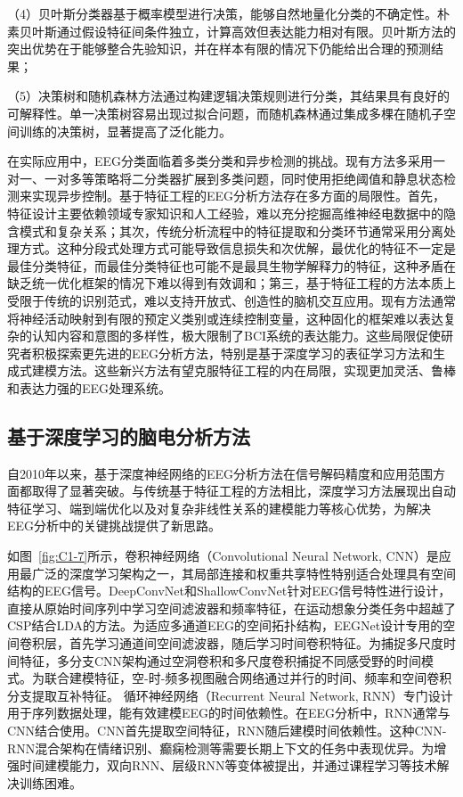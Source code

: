（4）贝叶斯分类器基于概率模型进行决策，能够自然地量化分类的不确定性\cite{friedman1997bayesian}。朴素贝叶斯通过假设特征间条件独立，计算高效但表达能力相对有限。贝叶斯方法的突出优势在于能够整合先验知识，并在样本有限的情况下仍能给出合理的预测结果；

（5）决策树和随机森林方法通过构建逻辑决策规则进行分类，其结果具有良好的可解释性\cite{fraiwan2012automated}。单一决策树容易出现过拟合问题，而随机森林通过集成多棵在随机子空间训练的决策树，显著提高了泛化能力。


在实际应用中，EEG分类面临着多类分类和异步检测的挑战。现有方法多采用一对一、一对多等策略将二分类器扩展到多类问题，同时使用拒绝阈值和静息状态检测来实现异步控制。基于特征工程的EEG分析方法存在多方面的局限性。首先，特征设计主要依赖领域专家知识和人工经验，难以充分挖掘高维神经电数据中的隐含模式和复杂关系；其次，传统分析流程中的特征提取和分类环节通常采用分离处理方式。这种分段式处理方式可能导致信息损失和次优解，最优化的特征不一定是最佳分类特征，而最佳分类特征也可能不是最具生物学解释力的特征，这种矛盾在缺乏统一优化框架的情况下难以得到有效调和；第三，基于特征工程的方法本质上受限于传统的识别范式，难以支持开放式、创造性的脑机交互应用。现有方法通常将神经活动映射到有限的预定义类别或连续控制变量，这种固化的框架难以表达复杂的认知内容和意图的多样性，极大限制了BCI系统的表达能力。这些局限促使研究者积极探索更先进的EEG分析方法，特别是基于深度学习的表征学习方法和生成式建模方法。这些新兴方法有望克服特征工程的内在局限，实现更加灵活、鲁棒和表达力强的EEG处理系统。

\subsection{基于深度学习的脑电分析方法}
自2010年以来，基于深度神经网络的EEG分析方法在信号解码精度和应用范围方面都取得了显著突破。与传统基于特征工程的方法相比，深度学习方法展现出自动特征学习、端到端优化以及对复杂非线性关系的建模能力等核心优势，为解决EEG分析中的关键挑战提供了新思路。


如图~\ref{fig:C1-7}所示，卷积神经网络（Convolutional Neural Network, CNN）是应用最广泛的深度学习架构之一，其局部连接和权重共享特性特别适合处理具有空间结构的EEG信号\cite{liu2020epileptic}。DeepConvNet和ShallowConvNet针对EEG信号特性进行设计，直接从原始时间序列中学习空间滤波器和频率特征，在运动想象分类任务中超越了CSP结合LDA的方法\cite{schirrmeister2017deep}。为适应多通道EEG的空间拓扑结构，EEGNet设计专用的空间卷积层，首先学习通道间空间滤波器，随后学习时间卷积特征\cite{lawhern2018eegnet}。为捕捉多尺度时间特征，多分支CNN架构通过空洞卷积和多尺度卷积捕捉不同感受野的时间模式\cite{ang2012filter}。为联合建模特征，空-时-频多视图融合网络通过并行的时间、频率和空间卷积分支提取互补特征。
循环神经网络（Recurrent Neural Network, RNN）专门设计用于序列数据处理，能有效建模EEG的时间依赖性。在EEG分析中，RNN通常与CNN结合使用\cite{zhang2021survey}。CNN首先提取空间特征，RNN随后建模时间依赖性。这种CNN-RNN混合架构在情绪识别、癫痫检测等需要长期上下文的任务中表现优异。为增强时间建模能力，双向RNN、层级RNN等变体被提出，并通过课程学习等技术解决训练困难。

